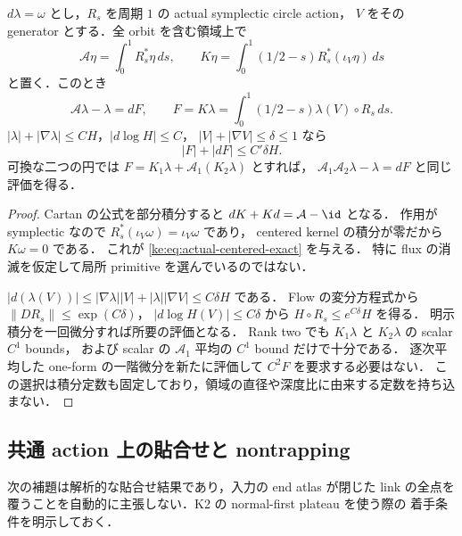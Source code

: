 \begin{lemma}
\label{ke:actual-centered-primitive-weighted}
$d\lambda=\omega$ とし，$R_s$ を周期 $1$ の actual symplectic circle action，
$V$ をその generator とする．全 orbit を含む領域上で
\[
 \mathcal A\eta=\int_0^1R_s^*\eta\,ds,
 \qquad K\eta=\int_0^1(1/2-s)R_s^*(\iota_V\eta)\,ds
\]
と置く．このとき
\begin{equation}\label{ke:eq:actual-centered-exact}
 \mathcal A\lambda-\lambda=dF,
 \qquad F=K\lambda
   =\int_0^1(1/2-s)\lambda(V)\circ R_s\,ds.
\end{equation}
$|\lambda|+|\nabla\lambda|\le CH$，$|d\log H|\le C$，
$|V|+|\nabla V|\le\delta\le1$ なら
\begin{equation}\label{ke:eq:centered-F-weighted-bound}
 |F|+|dF|\le C'\delta H.
\end{equation}
可換な二つの円では
$F=K_1\lambda+\mathcal A_1(K_2\lambda)$ とすれば，
$\mathcal A_1\mathcal A_2\lambda-\lambda=dF$ と同じ評価を得る．
\end{lemma}

\begin{proof}
Cartan の公式を部分積分すると
$dK+Kd=\mathcal A-\id$ となる．
作用が symplectic なので $R_s^*(\iota_V\omega)=\iota_V\omega$ であり，
centered kernel の積分が零だから $K\omega=0$ である．
これが \eqref{ke:eq:actual-centered-exact} を与える．
特に flux の消滅を仮定して局所 primitive を選んでいるのではない．

$|d(\lambda(V))|\le|\nabla\lambda||V|+|\lambda||\nabla V|
\le C\delta H$ である．
Flow の変分方程式から $\|DR_s\|\le\exp(C\delta)$，
$|d\log H(V)|\le C\delta$ から
$H\circ R_s\le e^{C\delta}H$ を得る．
明示積分を一回微分すれば所要の評価となる．
Rank two でも $K_1\lambda$ と $K_2\lambda$ の scalar $C^1$ bounds，
および scalar の $\mathcal A_1$ 平均の $C^1$ bound だけで十分である．
逐次平均した one-form の一階微分を新たに評価して $C^2F$ を要求する必要はない．
この選択は積分定数も固定しており，領域の直径や深度比に由来する定数を持ち込まない．
\end{proof}

\subsection{共通 action 上の貼合せと nontrapping}

次の補題は解析的な貼合せ結果であり，入力の end atlas が閉じた link の全点を
覆うことを自動的に主張しない．K2 の normal-first plateau を使う際の
着手条件を明示しておく．

